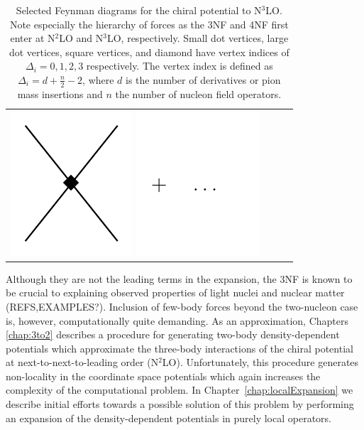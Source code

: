 \begin{table}
\begin{tabular}{ c | c | c | c }
{\includegraphics[scale=0.5,page=10]{Introduction/Figures/N3LO}
\includegraphics[scale=0.5,page=1]{Introduction/Figures/ellipsis} 
} \\
\end{tabular}
\caption[Selected Feynman diagrams for the chiral potential to N$^3$LO.]{\label{fig:chiralPotentialDiagrams} Selected Feynman diagrams for the chiral potential to N$^3$LO. Note especially the hierarchy of forces as the 3NF and 4NF first enter at N$^2$LO and N$^3$LO, respectively. Small dot vertices, large dot vertices, square vertices, and diamond have vertex indices of $\Delta_i = 0,1,2,3$ respectively. The vertex index is defined as $\Delta_i=d+\tfrac{n}{2}-2$, where $d$ is the number of derivatives or pion mass insertions and $n$ the number of nucleon field operators.}
\end{table}

Although they are not the leading terms in the expansion, the 3NF is known to be crucial to explaining observed properties of light nuclei and nuclear matter (REFS,EXAMPLES?). Inclusion of few-body forces beyond the two-nucleon case is, however, computationally quite demanding. As an approximation, 
Chapters \ref{chap:3to2} describes a procedure for generating two-body density-dependent potentials which approximate the three-body interactions of the chiral potential at next-to-next-to-leading order (N$^2$LO). Unfortunately, this procedure generates non-locality in the coordinate space potentials which again increases the complexity of the computational problem. In Chapter~\ref{chap:localExpansion} we describe initial efforts towards a possible solution of this problem by performing an expansion of the density-dependent potentials in purely local operators.

